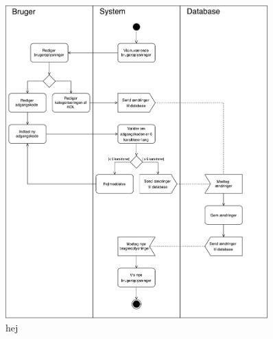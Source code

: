 \begin{figure} [H]
\centering
\includegraphics[width=0.9\textwidth]{figures/aktivitetsdiagram/Redigerbrugeroplysninger}
\caption{hej}
\label{fig:Redigerbrugeroplysninger}
\end{figure}

